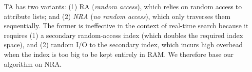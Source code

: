 TA has two variants: (1) RA (\emph{random access}), which  
 relies on random access to  attribute lists; 
and (2) {\em NRA} (\emph{no random access}),  which 
 only traverses them sequentially. The former is ineffective in the context of real-time search 
because it requires (1)  a secondary random-access index (which doubles the required index space), 
and (2) random I/O to the secondary index, which incurs high overhead when the index  is too big to be 
kept entirely in RAM. We therefore base our algorithm on  NRA. 





%

